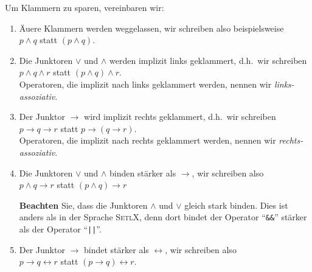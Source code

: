 \noindent
Um Klammern zu sparen, vereinbaren wir:
\begin{enumerate}
\item \"{A}u\3ere Klammern werden weggelassen, wir schreiben also beispielsweise \\[0.2cm]
      \hspace*{1.3cm} $p \wedge q$ \quad statt \quad $(p \wedge q)$.
\item Die Junktoren  $\vee$ und $\wedge$ werden implizit links geklammert, d.h.~wir
      schreiben 
      \\[0.2cm]
      \hspace*{1.3cm} $p \wedge q \wedge r$ \quad statt \quad $(p \wedge q) \wedge r$.
      \\[0.2cm]
      Operatoren, die implizit nach links geklammert werden, nennen wir \emph{links-assoziativ}.
\item Der Junktor $\rightarrow$ wird implizit rechts geklammert, d.h.~wir
      schreiben \\[0.2cm]
      \hspace*{1.3cm} $p \rightarrow q \rightarrow r$ \quad statt \quad $p \rightarrow (q \rightarrow r)$.
      \\[0.2cm]
      Operatoren, die implizit nach rechts geklammert werden, nennen wir \emph{rechts-assoziativ}.
\item Die Junktoren $\vee$ und $\wedge$ binden st\"{a}rker als $\rightarrow$, wir schreiben
      also \\[0.2cm]
      \hspace*{1.3cm} $p \wedge q \rightarrow r$ \quad statt \quad $(p \wedge q) \rightarrow r$

      \textbf{Beachten} Sie, dass die Junktoren $\wedge$ und $\vee$ gleich stark binden.  Dies ist
      anders als in der Sprache \textsc{SetlX}, denn dort bindet der Operator ``\texttt{\&\&}'' st\"{a}rker als
      der Operator ``\texttt{||}''.
\item Der Junktor $\rightarrow$ bindet st\"{a}rker als $\leftrightarrow$, wir schreiben
      also \\[0.2cm]
      \hspace*{1.3cm} $p \rightarrow q \leftrightarrow r$ \quad statt \quad $(p \rightarrow q) \leftrightarrow r$.
\end{enumerate}

